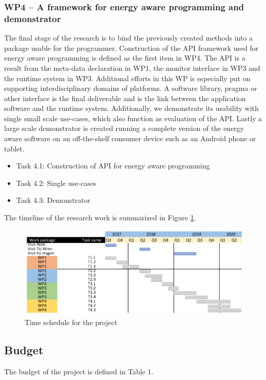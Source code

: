 \documentclass{article}
\begin{document}
\subsubsection{WP4 -- A framework for energy aware programming and demonstrator}
The final stage of the research is to bind the previously created methods into a package usable for the programmer.
Construction of the API framework used for energy aware programming is defined as the first item in WP4.
The API is a result from the meta-data declaration in WP1, the monitor interface in WP3 and the runtime system in WP3.
Additional efforts in this WP is especially put on supporting interdisciplinary domains of platforms.
A software library, pragma or other interface is the final deliverable and is the link between the application software and the runtime system.
Additionally, we demonstrate its usability with single small scale use-cases, which also function as evaluation of the API.
Lastly a large scale demonstrator is created running a complete version of the energy aware software on an off-the-shelf consumer device such as an Android phone or tablet.
\begin{itemize}
 \item Task 4.1: Construction of API for energy aware programming \vspace{-0.3cm}
 \item Task 4.2: Single use-cases \vspace{-0.3cm}
 \item Task 4.3: Demonstrator
\end{itemize}

The timeline of the research work is summarized in Figure \ref{fig:schedule}.
\begin{figure}[h]
	\centering
	\includegraphics[scale=0.45]{fig/schedule.png}
	\caption{Time schedule for the project}
	\label{fig:schedule}
\end{figure}

\subsection{Budget}
The budget of the project is defined in Table 1.
\end{document}
